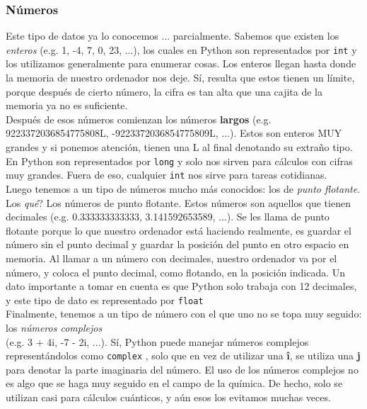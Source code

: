 \documentclass[10pt,letterpaper]{article}
\newcommand{\inlinecode}[1]{
\colorbox{light-gray}{\texttt{#1}}
}
\begin{document}
\subsubsection{N\'umeros}
Este tipo de datos ya lo conocemos ... parcialmente. Sabemos que existen los \textit{enteros} (e.g. 1, -4, 7, 0, 23, ...), los cuales en Python son representados por \inlinecode{int} y los utilizamos generalmente para enumerar cosas. Los enteros llegan hasta donde la memoria de nuestro ordenador nos deje. S\'i, resulta que estos tienen un l\'imite, porque despu\'es de cierto n\'umero, la cifra es tan alta que una cajita de la memoria ya no es suficiente.\\

Despu\'es de esos n\'umeros comienzan los n\'umeros \textbf{largos} (e.g. 9223372036854775808L, -9223372036854775809L, ...). Estos son enteros MUY grandes y si ponemos atenci\'on, tienen una L al final denotando su extra\~no tipo. En Python son representados por \inlinecode{long} y solo nos sirven para c\'alculos con cifras muy grandes. Fuera de eso, cualquier \inlinecode{int} nos sirve para tareas cotidianas.\\

Luego tenemos a un tipo de n\'umeros mucho m\'as conocidos: los de \textit{punto flotante}. Los \emph{qu\'e}? Los n\'umeros de punto flotante. Estos n\'umeros son aquellos que tienen decimales (e.g. 0.333333333333, 3.141592653589, ...). Se les llama de punto flotante porque lo que nuestro  ordenador est\'a haciendo realmente, es guardar el n\'umero sin el punto decimal y guardar la posici\'on del punto en otro espacio en memoria. Al llamar a un n\'umero con decimales, nuestro ordenador va por el n\'umero, y coloca el punto decimal, como flotando, en la posici\'on indicada. Un dato importante a tomar en cuenta es que Python solo trabaja con 12 decimales, y este tipo de dato es representado por \inlinecode{float}\\

Finalmente, tenemos a un tipo de n\'umero con el que uno no se topa muy seguido: los \textit{n\'umeros complejos}\\(e.g. 3 + 4i, -7 - 2i, ...). S\'i, Python puede manejar n\'umeros complejos represent\'andolos como \inlinecode{complex}, solo que en vez de utilizar una \textbf{\^{i}}, se utiliza una \textbf{j} para denotar la parte imaginaria del n\'umero. El uso de los n\'umeros complejos no es algo que se haga muy seguido en el campo de la qu\'imica. De hecho, solo se utilizan casi para c\'alculos cu\'anticos, y a\'un esos los evitamos muchas veces.
\end{document}
